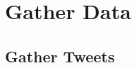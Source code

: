 
\lipsum[1]

\section{Gather Data}
\label{s:casestudy-gatherdata}

\lipsum[1]

\subsection{Gather Tweets}
\label{ss:casestudy-gatherdata-tweets}


